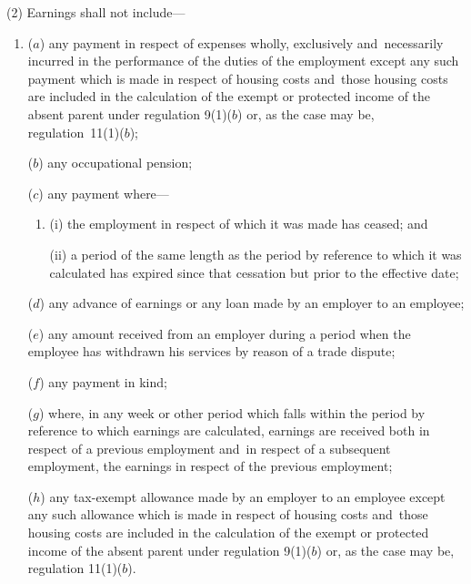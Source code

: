 \documentclass[12pt,a4paper]{article}
\begin{document}
(2) Earnings shall not include—
\begin{enumerate}\item[]
($a$) any payment in respect of expenses wholly, exclusively and~necessarily incurred in the performance of the duties of the employment
except any such payment which is made in respect of housing costs and~those housing costs are included in the calculation of the exempt or protected income of the absent parent under regulation 9(1)($b$) or, as the case may be, regulation~11(1)($b$);  %

($b$) any occupational pension;

($c$) any payment where—
\begin{enumerate}\item[]
(i) the employment in respect of which it was made has ceased; and

(ii) a period of the same length as the period by reference to which it was calculated has expired since that cessation but prior to the effective date;
\end{enumerate}

($d$) any advance of earnings or any loan made by an employer to an employee;

($e$) any amount received from an employer during a period when the employee has withdrawn his services by reason of a trade dispute;

($f$) any payment in kind;

($g$) where, in any week or other period which falls within the period by reference to which earnings are calculated, earnings are received both in respect of a previous employment and~in respect of a subsequent employment, the earnings in respect of the previous employment;

($h$) any tax-exempt allowance made by an employer to an employee
except any such allowance which is made in respect of housing costs and~those housing costs are included in the calculation of the exempt or protected income of the absent parent under regulation 9(1)($b$) or, as the case may be, regulation 11(1)($b$).  %
\end{enumerate}
\end{document}
